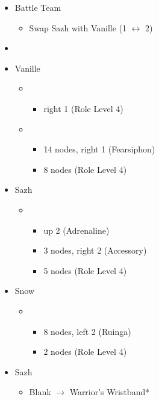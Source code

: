 \begin{menu}
	\begin{itemize}
		\paradigm
		\begin{itemize}
			\item Battle Team
				\begin{itemize}
					\item Swap Sazh with Vanille (1 $\leftrightarrow$ 2)
				\end{itemize}
			\item {}%
				{\paradigmline{\com}{(\com)}{\com}}%
				{\paradigmline{(\sab)}{\com}{\com}}%
				{\paradigmline{\rav}{\rav}{\sen}}%
				{\paradigmline{(\sab)}{(\syn)}{\sen}}%
				{\paradigmline[4]{(\sab)}{\rav}{(\rav)}}%
				{\paradigmline{\rav}{\rav}{\rav}}%
		\end{itemize}
		\crystarium
		\begin{itemize}
			\item Vanille
				\begin{itemize}
					\item \med
						\begin{itemize}
							\item right 1 (Role Level 4)
						\end{itemize}
					\item \rav
						\begin{itemize}
							\item 14 nodes, right 1 (Fearsiphon)
							\item 8 nodes (Role Level 4)
						\end{itemize}
				\end{itemize}
			\item Sazh
				\begin{itemize}
					\item \com
						\begin{itemize}
							\item up 2 (Adrenaline)
							\item 3 nodes, right 2 (Accessory)
							\item 5 nodes (Role Level 4)
						\end{itemize}
				\end{itemize}
			\item Snow
				\begin{itemize}
					\item \com
						\begin{itemize}
							\item 8 nodes, left 2 (Ruinga)
							\item 2 nodes (Role Level 4)
						\end{itemize}
				\end{itemize}
		\end{itemize}
		\equip
		\begin{itemize}
			\item Sazh
				\begin{itemize}
					\item Blank $\rightarrow$ Warrior's Wristband*
				\end{itemize}
		\end{itemize}
	\end{itemize}
\end{menu}

